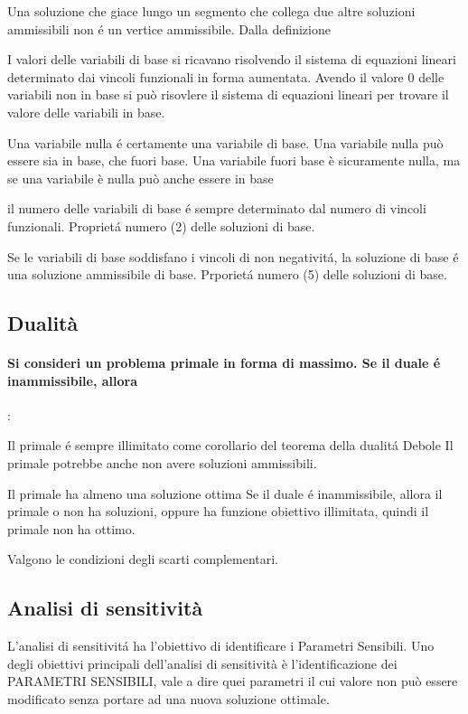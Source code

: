 \documentclass[12pt, a4paper, openany]{book}
\begin{document}
\affermazionetrue
{Una soluzione che giace lungo un segmento che collega due altre soluzioni ammissibili non é un vertice ammissibile.}
{Dalla definizione}

\affermazionetrue
{I valori delle variabili di base si ricavano risolvendo il sistema di equazioni lineari determinato dai vincoli funzionali in forma aumentata.}
{Avendo il valore 0 delle variabili non in base si può risovlere il sistema di equazioni lineari per trovare il valore delle variabili in base.}

\affermazionefalse
{Una variabile nulla é certamente una variabile di base.}
{Una variabile nulla può essere sia in base, che fuori base. Una variabile fuori base è sicuramente nulla,
ma se una variabile è nulla può anche essere in base}

\affermazionetrue
{il numero delle variabili di base é sempre determinato dal numero di vincoli funzionali.}
{Proprietá numero (2) delle soluzioni di base.}

\affermazionetrue
{Se le variabili di base soddisfano i vincoli di non negativitá, la soluzione di base é una soluzione ammissibile di base.}
{Prporietá numero (5) delle soluzioni di base.}


\subsection{Dualità}
\paragraph{Si consideri un problema primale in forma di massimo. Se il duale é inammissibile, allora}:

\affermazionefalse
{Il primale é sempre illimitato come corollario del teorema della dualitá Debole}
{Il primale potrebbe anche non avere soluzioni ammissibili.}

\affermazionefalse
{Il primale ha almeno una soluzione ottima}
{Se il duale é inammissibile, allora il primale o non ha soluzioni, oppure ha funzione obiettivo illimitata, quindi il primale non ha ottimo.}

\affermazione
{Valgono le condizioni degli scarti complementari.}

\subsection{Analisi di sensitività}

\affermazionetrue
{L'analisi di sensitivitá ha l'obiettivo di identificare i Parametri Sensibili.}
{Uno degli obiettivi principali dell'analisi di sensitività è l'identificazione dei PARAMETRI SENSIBILI, vale
a dire quei parametri il cui valore non può essere modificato senza portare ad una nuova soluzione
ottimale.}
\end{document}

